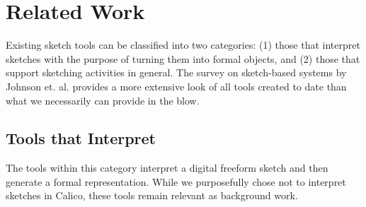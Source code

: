 \documentclass[12pt,fleqn]{ucithesis}
\begin{document}
 \newpage 
 \newpage \chapter{Related Work}
\label{chapter:related-work}

Existing sketch tools can be classified into two categories: (1) those that interpret sketches with the purpose of turning them into formal objects, and (2) those that support sketching activities in general. The survey on sketch-based systems by Johnson et. al. \citep{Johnson} provides a more extensive look of all tools created to date than what we necessarily can provide in the blow.

\section{Tools that Interpret}
\label{relatedwork:1}

The  tools within this category interpret a digital freeform sketch and then generate a formal representation. While we purposefully chose not to interpret sketches in Calico, these tools remain relevant as background work.
\end{document}
